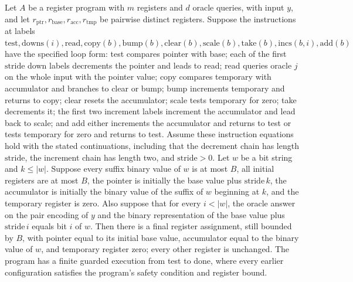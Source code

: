 \begin{theorem}
\label{Complexity.Codec.decodeStride_loop}
\leanok
{}
Let $A$ be a register program with $m$ registers and $d$ oracle queries, with input $y$,
and let $r_{\mathrm{ptr}},r_{\mathrm{base}},r_{\mathrm{acc}},r_{\mathrm{tmp}}$ be
pairwise distinct registers. Suppose the instructions at labels
$\mathrm{test},\mathrm{downs}(i),\mathrm{read},\mathrm{copy}(b),\mathrm{bump}(b),\mathrm{clear}(b),\mathrm{scale}(b),\mathrm{take}(b),\mathrm{incs}(b,i),\mathrm{add}(b)$
have the specified loop form: test compares pointer with base; each of the first
$\mathrm{stride}$ down labels decrements the pointer and leads to read; read queries
oracle $j$ on the whole input with the pointer value; copy compares temporary with
accumulator and branches to clear or bump; bump increments temporary and returns to
copy; clear resets the accumulator; scale tests temporary for zero; take decrements it;
the first two increment labels increment the accumulator and lead back to scale; and add
either increments the accumulator and returns to test or tests temporary for zero and
returns to test. Assume these instruction equations hold with the stated continuations,
including that the decrement chain has length $\mathrm{stride}$, the increment chain has
length two, and $\mathrm{stride}>0$. Let $w$ be a bit string and $k\leq |w|$. Suppose
every suffix binary value of $w$ is at most $B$, all initial registers are at most $B$,
the pointer is initially the base value plus $\mathrm{stride}\,k$, the accumulator is
initially the binary value of the suffix of $w$ beginning at $k$, and the temporary
register is zero. Also suppose that for every $i<|w|$, the oracle answer on the pair
encoding of $y$ and the binary representation of the base value plus
$\mathrm{stride}\,i$ equals bit $i$ of $w$. Then there is a final register assignment,
still bounded by $B$, with pointer equal to its initial base value, accumulator equal to
the binary value of $w$, and temporary register zero; every other register is unchanged.
The program has a finite guarded execution from test to done, where every earlier
configuration satisfies the program's safety condition and register bound.
\end{theorem}

